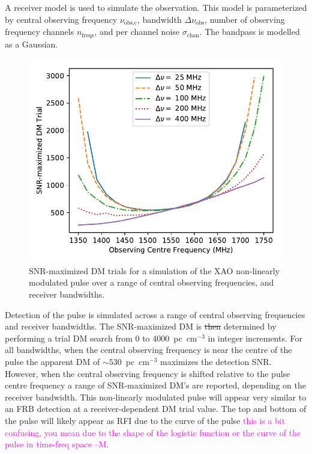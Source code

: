 \documentclass[a4paper,fleqn,usenatbib]{mnras}
\newcommand{\cM}[1]{\textcolor{magenta}{ #1 --M}}
\begin{document}
A receiver model is used to simulate the observation. This model is
parameterized by central observing frequency $\nu_{\textrm{obs,c}}$, bandwidth
$\Delta \nu_{\textrm{obs}}$, number of observing frequency channels
$n_{\textrm{freqs}}$, and per channel noise $\sigma_{\textrm{chan}}$. The
bandpass is modelled as a Gaussian.

\begin{figure}
    \includegraphics[width=1.0\linewidth]{figures/simulatedRADARdm.pdf}
    \caption{SNR-maximized DM trials for a simulation of the XAO non-linearly
    modulated pulse over a range of central observing frequencies, and receiver
    bandwidths.
    }
    \label{fig:xao_simulated_dm}
\end{figure}

Detection of the pulse is simulated across a range of central observing
frequencies and receiver bandwidths. The SNR-maximized DM is \sout{then} determined by
performing a trial DM search from 0 to 4000~pc~cm$^{-3}$ in integer increments.
For all bandwidths, when the central observing frequency is near the centre of
the pulse the apparent DM of $\sim530$~pc~cm$^{-3}$ maximizes the detection
SNR. However, when the central observing frequency is shifted relative to the
pulse centre frequency a range of SNR-maximized DM's are reported, depending on
the receiver bandwidth. This non-linearly modulated pulse will appear very
similar to an FRB detection at a receiver-dependent DM trial value. The top and
bottom of the pulse will likely appear as RFI due to the curve of the pulse \cM{this is a bit confusing, you mean due to the shape of the logistic function or the curve of the pulse in time-freq space}.
\end{document}
